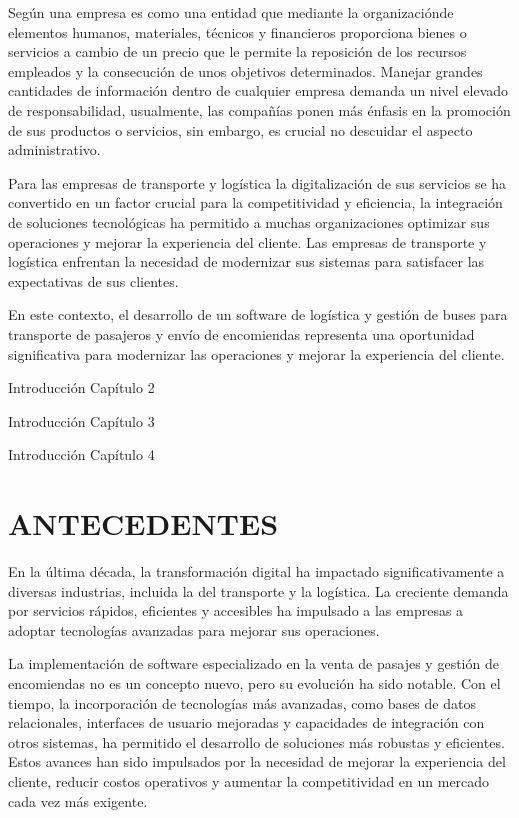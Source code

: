 	Según \textcite{casanueva2000practicas} una empresa es como una entidad que mediante la organizaciónde elementos humanos, materiales, técnicos y financieros proporciona bienes o servicios a cambio de un precio que le permite la reposición de los recursos empleados y la consecución de unos objetivos determinados. Manejar grandes cantidades de información dentro de cualquier empresa demanda un nivel elevado de responsabilidad, usualmente, las compañías ponen más énfasis en la promoción de sus productos o servicios, sin embargo, es crucial no descuidar el aspecto administrativo.
	
	Para las empresas de transporte y logística la digitalización de sus servicios se ha convertido en un factor crucial para la competitividad y eficiencia, la integración de soluciones tecnológicas ha permitido a muchas organizaciones optimizar sus operaciones y mejorar la experiencia del cliente. Las empresas de transporte y logística enfrentan la necesidad de modernizar sus sistemas para satisfacer las expectativas de sus clientes. 
	
	En este contexto, el desarrollo de un software de logística y gestión de buses para transporte de pasajeros y envío de encomiendas representa una oportunidad significativa para modernizar las operaciones y mejorar la experiencia del cliente.
	
	Introducción Capítulo 2
	
	Introducción Capítulo 3
	
	Introducción Capítulo 4
	
\section{ANTECEDENTES}

	En la última década, la transformación digital ha impactado significativamente a diversas industrias, incluida la del transporte y la logística. La creciente demanda por servicios rápidos, eficientes y accesibles ha impulsado a las empresas a adoptar tecnologías avanzadas para mejorar sus operaciones.
	
	La implementación de software especializado en la venta de pasajes y gestión de encomiendas no es un concepto nuevo, pero su evolución ha sido notable. Con el tiempo, la incorporación de tecnologías más avanzadas, como bases de datos relacionales, interfaces de usuario mejoradas y capacidades de integración con otros sistemas, ha permitido el desarrollo de soluciones más robustas y eficientes. Estos avances han sido impulsados por la necesidad de mejorar la experiencia del cliente, reducir costos operativos y aumentar la competitividad en un mercado cada vez más exigente.
	
